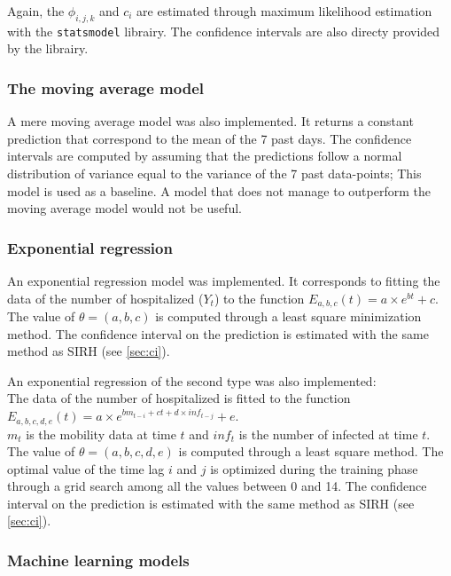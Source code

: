 Again, the $\phi_{i,j,k}$ and  $c_i$ are estimated through maximum likelihood estimation with the \texttt{statsmodel} librairy. 
The confidence intervals are also directy provided by the librairy.
\subsubsection{The moving average model}
\label{sec:moving_average}

A mere moving average model was also implemented. 
It returns a constant prediction that correspond to the mean of the 7 past days. 
The confidence intervals are computed by assuming that the predictions follow a normal distribution of variance equal to the variance of the 7 past data-points; 
This model is used as a baseline.
A model that does not manage to outperform the moving average model would not be useful. 

\subsubsection{Exponential regression}

An exponential regression model was implemented.
It corresponds to fitting the data of the number of hospitalized ($Y_t$) to the function $E_{a, b, c}(t) = a \times e^{b t} +c$.
The value of $\theta = (a, b, c)$ is computed through a least square minimization method.
The confidence interval on the prediction is estimated with the same method as SIRH (see \ref{sec:ci}). 

An exponential regression of the second type was also implemented: \\
The data of the number of hospitalized is fitted to the function $E_{a, b, c, d, e}(t) = a \times e^{b m_{t-i} + c  t + d \times inf_{t-j} }+e$.\\
$m_t$ is the mobility data at time $t$ and $inf_t$ is the number of infected at time $t$.
The value of $\theta = (a, b, c, d, e)$ is computed through a least square method.
The optimal value of the time lag $i$ and $j$ is optimized during the training phase through a grid search among all the values between 0 and 14. 
The confidence interval on the prediction is estimated with the same method as SIRH (see \ref{sec:ci}). 

\subsubsection{Machine learning models}
\label{sec:mlmodels}

